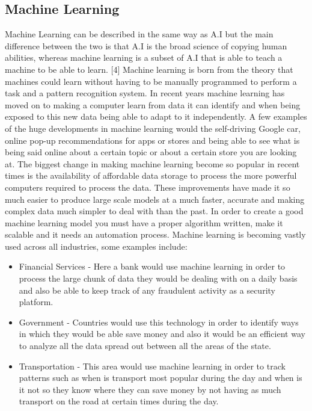 \documentclass[letterpaper, 10 pt, conference]{ieeeconf}  %
\begin{document}
\subsection{Machine Learning} 
Machine Learning can be described in the same way as A.I but the main difference between the two is that A.I is the broad science of copying human abilities, whereas machine learning is a subset of A.I that is able to teach a machine to be able to learn. [4] Machine learning is born from the theory that machines could learn without having to be manually programmed to perform a task and a pattern recognition system. In recent years machine learning has moved on to making a computer learn from data it can identify and when being exposed to this new data being able to adapt to it independently. A few examples of the huge developments in machine learning would the self-driving Google car, online pop-up recommendations for apps or stores and being able to see what is being said online about a certain topic or about a certain store you are looking at. 
The biggest change in making machine learning become so popular in recent times is the availability of affordable data storage to process the more powerful computers required to process the data. These improvements have made it so much easier to produce large scale models at a much faster, accurate and making complex data much simpler to deal with than the past. In order to create a good machine learning model you must have a proper algorithm written, make it scalable and it needs an automation process. Machine learning is becoming vastly used across all industries, some examples include: 
\begin{itemize}
\item Financial Services - Here a bank would use machine learning in order to process the large chunk of data they would be dealing with on a daily basis and also be able to keep track of any fraudulent activity as a security platform.
\end{itemize}

\begin{itemize}
\item Government - Countries would use this technology in order to identify ways in which they would be able save money and also it would be an efficient way to analyze all the data spread out between all the areas of the state.
\end{itemize}

\begin{itemize}
\item Transportation - This area would use machine learning in order to track patterns such as when is transport most popular during the day and when is it not so they know where they can save money by not having as much transport on the road at certain times during the day.
\end{itemize}
\end{document}
